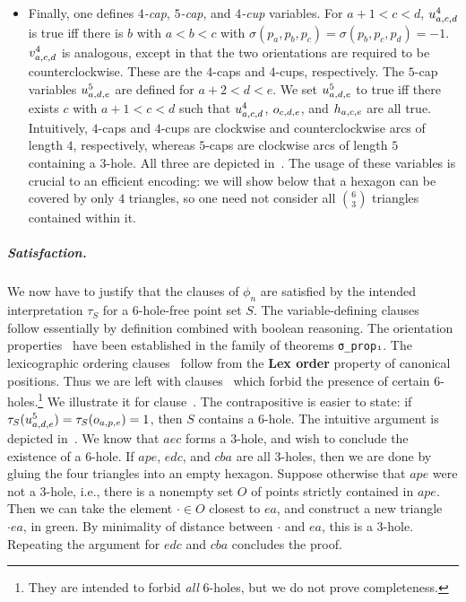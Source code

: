 \begin{itemize}
  \item
    Finally, one defines \emph{$4$-cap}, \emph{$5$-cap}, and \emph{$4$-cup} variables.
    For $a+1 < c < d$, $\uvar_{a,c,d}$ is true
    iff there is $b$ with $a < b < c$ with $\sigma(p_a,p_b,p_c) = \sigma(p_b,p_c,p_d) = -1$.
    $\vvar_{a,c,d}$ is analogous, except in that the two orientations are required to be counterclockwise.
    These are the $4$-caps and $4$-cups, respectively.
    The $5$-cap variables $\ufvar_{a,d,e}$
    are defined for $a+2 < d < e$.
    We set $\ufvar_{a,d,e}$ to true
    iff there exists $c$ with $a+1<c<d$
    such that $\uvar_{a,c,d}$, $\orvar_{c,d,e}$, and $\hvar_{a,c,e}$ are all true.
    Intuitively, $4$-caps and $4$-cups are clockwise and counterclockwise arcs of length $4$,
    respectively,
    whereas $5$-caps are clockwise arcs of length $5$ containing a $3$-hole.
    All three are depicted in~. The usage of these variables is crucial to an efficient encoding:
    we will show below that a hexagon can be covered by only $4$ triangles,
    so one need not consider all ${6\choose 3}$ triangles contained within it.
\end{itemize}



\subparagraph*{Satisfaction.}
We now have to justify that the clauses of $\phi_n$
are satisfied by the intended interpretation $\tau_S$
for a $6$-hole-free point set $S$.
The variable-defining clauses~
follow essentially by definition combined with boolean reasoning.
The orientation properties~
have been established in the family of theorems \lstinline|σ_propᵢ|.
The lexicographic ordering clauses~
follow from the \textbf{Lex order} property of canonical positions.
Thus we are left with clauses~
which forbid the presence of certain $6$-holes.\footnote{
They are intended to forbid \emph{all} $6$-holes,
but we do not prove completeness.}
We illustrate it for clause~.
The contrapositive is easier to state:
if $\tau_S(\ufvar_{a,d,e}) = \tau_S(\orvar_{a,p,e}) = 1$,
then $S$ contains a $6$-hole.
The intuitive argument is depicted in~.
We know that $aec$ forms a $3$-hole,
and wish to conclude the existence of a $6$-hole.
If $ape$, $edc$, and $cba$ are all $3$-holes,
then we are done
by gluing the four triangles into an empty hexagon.
Suppose otherwise that $ape$ were not a $3$-hole,
i.e., there is a nonempty set $O$
of points strictly contained in $ape$.
Then we can take the element $\cdot \in O$ closest to $ea$,
and construct a new triangle $\cdot ea$, in green.
By minimality of distance between $\cdot$ and $ea$,
this is a $3$-hole.
Repeating the argument for $edc$ and $cba$ concludes the proof.

